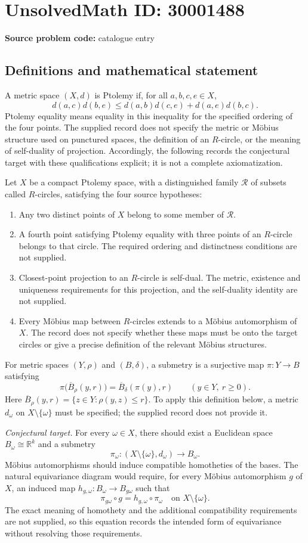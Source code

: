 \documentclass[11pt]{article}
\newcommand{\R}{\mathbb{R}}
\begin{document}
\section*{UnsolvedMath ID: 30001488}
\textbf{Source problem code:} catalogue entry
\subsection{Definitions and mathematical statement}
A metric space $(X,d)$ is Ptolemy if, for all $a,b,c,e\in X$,
\[
d(a,c)d(b,e)\leq d(a,b)d(c,e)+d(a,e)d(b,c).
\]
Ptolemy equality means equality in this inequality for the specified ordering of the four points. The supplied record does not specify the metric or Möbius structure used on punctured spaces, the definition of an $R$-circle, or the meaning of self-duality of projection. Accordingly, the following records the conjectural target with these qualifications explicit; it is not a complete axiomatization.

Let $X$ be a compact Ptolemy space, with a distinguished family $\mathcal R$ of subsets called $R$-circles, satisfying the four source hypotheses:
\begin{enumerate}
\item Any two distinct points of $X$ belong to some member of $\mathcal R$.
\item A fourth point satisfying Ptolemy equality with three points of an $R$-circle belongs to that circle. The required ordering and distinctness conditions are not supplied.
\item Closest-point projection to an $R$-circle is self-dual. The metric, existence and uniqueness requirements for this projection, and the self-duality identity are not supplied.
\item Every Möbius map between $R$-circles extends to a Möbius automorphism of $X$. The record does not specify whether these maps must be onto the target circles or give a precise definition of the relevant Möbius structures.
\end{enumerate}

For metric spaces $(Y,\rho)$ and $(B,\delta)$, a submetry is a surjective map $\pi:Y\to B$ satisfying
\[
\pi\bigl(\overline B_\rho(y,r)\bigr)=\overline B_\delta(\pi(y),r)
\qquad(y\in Y,\ r\geq0).
\]
Here $\overline B_\rho(y,r)=\{z\in Y:\rho(y,z)\leq r\}$. To apply this definition below, a metric $d_\omega$ on $X\setminus\{\omega\}$ must be specified; the supplied record does not provide it.

\emph{Conjectural target.} For every $\omega\in X$, there should exist a Euclidean space $B_\omega\cong\R^k$ and a submetry
\[
\pi_\omega:(X\setminus\{\omega\},d_\omega)\longrightarrow B_\omega.
\]
Möbius automorphisms should induce compatible homotheties of the bases. The natural equivariance diagram would require, for every Möbius automorphism $g$ of $X$, an induced map $h_{g,\omega}:B_\omega\to B_{g\omega}$ such that
\[
\pi_{g\omega}\circ g=h_{g,\omega}\circ\pi_\omega
\quad\text{on }X\setminus\{\omega\}.
\]
The exact meaning of homothety and the additional compatibility requirements are not supplied, so this equation records the intended form of equivariance without resolving those requirements.
\end{document}
